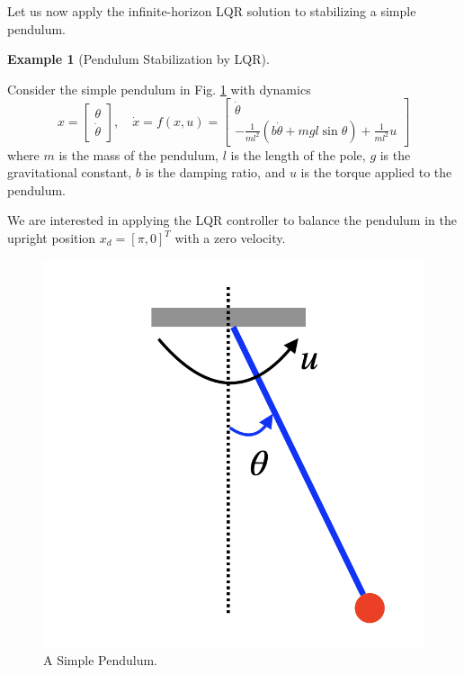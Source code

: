 \documentclass[
]{book}
\theoremstyle{definition}
\theoremstyle{definition}
\newtheorem{example}{Example}[chapter]
\theoremstyle{definition}
\theoremstyle{definition}
\theoremstyle{remark}
\begin{document}
Let us now apply the infinite-horizon LQR solution to stabilizing a simple pendulum.

\begin{example}[Pendulum Stabilization by LQR]
\protect\hypertarget{exm:lqr-pendulum-stabilization}{}\label{exm:lqr-pendulum-stabilization}

Consider the simple pendulum in Fig. \ref{fig:pendulum-drawing} with dynamics
\begin{equation}
x = \begin{bmatrix} \theta \\ \dot{\theta} \end{bmatrix}, \quad 
\dot{x} = f(x,u) = \begin{bmatrix}
\dot{\theta} \\
-\frac{1}{ml^2}(b \dot{\theta} + mgl \sin \theta) + \frac{1}{ml^2} u
\end{bmatrix}
\label{eq:lqr-pendulum-dynamics}
\end{equation}
where \(m\) is the mass of the pendulum, \(l\) is the length of the pole, \(g\) is the gravitational constant, \(b\) is the damping ratio, and \(u\) is the torque applied to the pendulum.

We are interested in applying the LQR controller to balance the pendulum in the upright position \(x_d = [\pi,0]^T\) with a zero velocity.

\begin{figure}

{\centering \includegraphics[width=0.4\linewidth]{images/pendulum-drawing} 

}

\caption{A Simple Pendulum.}\label{fig:pendulum-drawing}
\end{figure}


\end{example}
\end{document}
